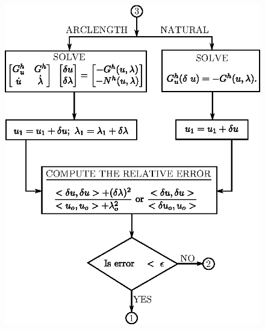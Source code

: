 \begin{figure}[H]
\centering
\includegraphics[scale=1.2]{vol79-fig/fig79-flowchart2.eps}
\end{figure}\pageoriginale

\vfill\eject

